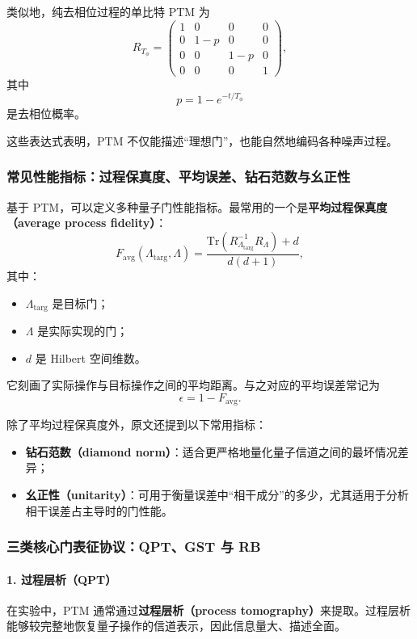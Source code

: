\documentclass[12pt,a4paper,oneside]{ctexbook}
\begin{document}
类似地，纯去相位过程的单比特 PTM 为
\begin{equation}
R_{T_\phi}
=
\begin{pmatrix}
1 & 0 & 0 & 0 \\
0 & 1-p & 0 & 0 \\
0 & 0 & 1-p & 0 \\
0 & 0 & 0 & 1
\end{pmatrix},
\tag{73}
\end{equation}
其中
\[
p=1-e^{-t/T_\phi}
\]
是去相位概率。

这些表达式表明，PTM 不仅能描述“理想门”，也能自然地编码各种噪声过程。

\subsubsection{常见性能指标：过程保真度、平均误差、钻石范数与幺正性}

基于 PTM，可以定义多种量子门性能指标。最常用的一个是\textbf{平均过程保真度（average process fidelity）}：
\begin{equation}
F_{\mathrm{avg}}(\Lambda_{\mathrm{targ}},\Lambda)
=
\frac{
\mathrm{Tr}\!\left(R_{\Lambda_{\mathrm{targ}}}^{-1}R_\Lambda\right)+d
}{
d(d+1)
},
\tag{74}
\end{equation}
其中：
\begin{itemize}
    \item \(\Lambda_{\mathrm{targ}}\) 是目标门；
    \item \(\Lambda\) 是实际实现的门；
    \item \(d\) 是 Hilbert 空间维数。
\end{itemize}

它刻画了实际操作与目标操作之间的平均距离。与之对应的平均误差常记为
\[
\epsilon = 1-F_{\mathrm{avg}}.
\]

除了平均过程保真度外，原文还提到以下常用指标：
\begin{itemize}
    \item \textbf{钻石范数（diamond norm）}：适合更严格地量化量子信道之间的最坏情况差异；
    \item \textbf{幺正性（unitarity）}：可用于衡量误差中“相干成分”的多少，尤其适用于分析相干误差占主导时的门性能。
\end{itemize}

\subsubsection{三类核心门表征协议：QPT、GST 与 RB}

\paragraph{1. 过程层析（QPT）}
在实验中，PTM 通常通过\textbf{过程层析（process tomography）}来提取。过程层析能够较完整地恢复量子操作的信道表示，因此信息量大、描述全面。
\end{document}
